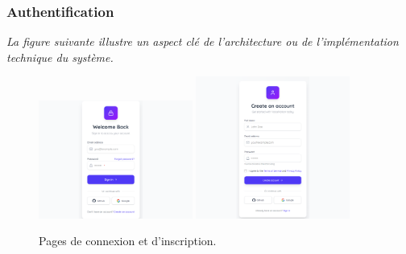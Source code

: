 \subsubsection{Authentification}
\noindent
\textit{La figure suivante illustre un aspect clé de l'architecture ou de l'implémentation technique du système.}
\begin{figure}[H]
    \centering
    \includegraphics[width=0.45\textwidth]{assets/docs/web/login-page.png}
    \hfill
    \includegraphics[width=0.45\textwidth]{assets/docs/web/singup.png}
    \caption{Pages de connexion et d'inscription.}
    \label{fig:web-auth}
\end{figure}


